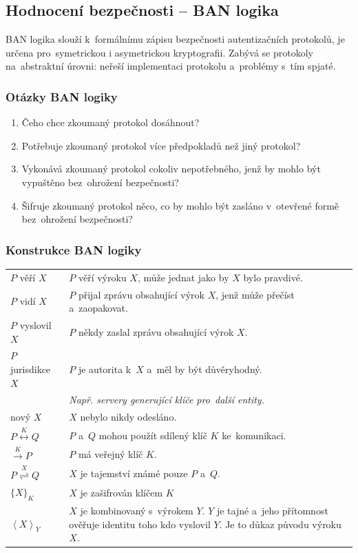 \subsection{Hodnocení bezpečnosti -- BAN logika}

BAN logika slouží k~formálnímu zápisu bezpečnosti autentizačních protokolů, je určena pro~symetrickou i asymetrickou kryptografii.
Zabývá se protokoly na~abstraktní úrovni: neřeší implementaci protokolu a~problémy s~tím spjaté.

\subsubsection{Otázky BAN logiky}

\begin{enumerate}
    \item Čeho chce zkoumaný protokol dosáhnout?
    \item Potřebuje zkoumaný protokol více předpokladů než jiný protokol?
    \item Vykonává zkoumaný protokol cokoliv nepotřebného, jenž by mohlo být vypuštěno bez~ohrožení bezpečnosti?
    \item Šifruje zkoumaný protokol něco, co by mohlo být zasláno v~otevřené formě bez~ohrožení bezpečnosti?
\end{enumerate}

\subsubsection{Konstrukce BAN logiky}

\begin{tabularx}{\textwidth}{lX}
$P$ věří $X$ & $P$ věří výroku $X$, může jednat jako by $X$ bylo pravdivé. \\
$P$ vidí $X$ & $P$ přijal zprávu obsahující výrok $X$, jenž může přečíst a~zaopakovat. \\
$P$ vyslovil $X$ & $P$ někdy zaslal zprávu obsahující výrok $X$. \\
$P$ jurisdikce $X$ & $P$ je autorita k~$X$ a~měl by být důvěryhodný. \\
& \emph{Např. servery generující klíče pro~další entity.} \\
nový $X$ & $X$ nebylo nikdy odesláno. \\
$P \stackrel{K}{\leftrightarrow} Q$ & $P$ a~$Q$ mohou použít sdílený klíč $K$ ke~komunikaci. \\
$\stackrel{K}{\rightarrow} P$ & $P$ má veřejný klíč $K$. \\
$P \stackrel{X}{\rightleftharpoons} Q$ & $X$ je tajemství známé pouze $P$ a~$Q$. \\
$\{X\}_K$ & $X$ je zašifrován klíčem $K$ \\
$\left<X\right>_Y$ & $X$ je kombinovaný s~výrokem $Y$. $Y$ je tajné a~jeho přítomnost ověřuje identitu toho kdo vyslovil $Y$. Je to důkaz původu výroku $X$. \\
\end{tabularx}


